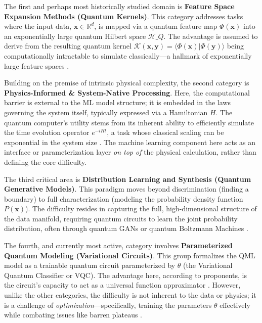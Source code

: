 \documentclass{article}
\begin{document}
The first and perhaps most historically studied domain is \textbf{Feature Space Expansion Methods (Quantum Kernels)}. This category addresses tasks where the input data, $\mathbf{x} \in \mathbb{R}^d$, is mapped via a quantum feature map $\Phi(\mathbf{x})$ into an exponentially large quantum Hilbert space $\mathcal{H}\_Q$. The advantage is assumed to derive from the resulting quantum kernel $\mathcal{K}(\mathbf{x}, \mathbf{y}) = \langle \Phi(\mathbf{x}) | \Phi(\mathbf{y}) \rangle$ being computationally intractable to simulate classically---a hallmark of exponentially large feature spaces \cite{jager2023universal}.

Building on the premise of intrinsic physical complexity, the second category is \textbf{Physics-Informed \& System-Native Processing}. Here, the computational barrier is external to the ML model structure; it is embedded in the laws governing the system itself, typically expressed via a Hamiltonian $H$. The quantum computer's utility stems from its inherent ability to efficiently simulate the time evolution operator $e^{-iHt}$, a task whose classical scaling can be exponential in the system size . The machine learning component here acts as an interface or parameterization layer \textit{on top of} the physical calculation, rather than defining the core difficulty.

The third critical area is \textbf{Distribution Learning and Synthesis (Quantum Generative Models)}. This paradigm moves beyond discrimination (finding a boundary) to full characterization (modeling the probability density function $P(\mathbf{x})$). The difficulty resides in capturing the full, high-dimensional structure of the data manifold, requiring quantum circuits to learn the joint probability distribution, often through quantum GANs or quantum Boltzmann Machines \cite{zhu2022generative}.

The fourth, and currently most active, category involves \textbf{Parameterized Quantum Modeling (Variational Circuits)}. This group formalizes the QML model as a trainable quantum circuit parameterized by $\theta$ (the Variational Quantum Classifier or VQC). The advantage here, according to proponents, is the circuit's capacity to act as a universal function approximator \cite{goto2021universal}. However, unlike the other categories, the difficulty is not inherent to the data or physics; it is a challenge of \textit{optimization}---specifically, training the parameters $\theta$ effectively while combating issues like barren plateaus \cite{cerezo2021cost}.
\end{document}
